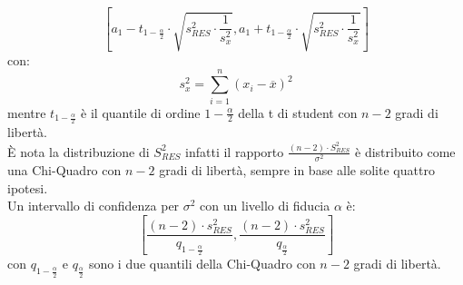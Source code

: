 \documentclass[a4paper,12pt, oneside]{book}
\begin{document}
  \[\left[a_{1}-t_{1-\frac{\alpha}{2}} \cdot \sqrt{s_{R E S}^{2} \cdot \frac{1}{s_{x}^{2}}}, a_{1}+t_{1-\frac{\alpha}{2}} \cdot \sqrt{s_{R E S}^{2} \cdot \frac{1}{s_{x}^{2}}}\right]\]
con:
\[s_{x}^{2}=\sum_{i=1}^{n}\left(x_{i}-\overline{x}\right)^{2}\]
mentre $t_{1-\frac{\alpha}{2}}$ è il quantile di ordine $1-\frac{\alpha}{2}$ della t di student con $n-2$ gradi di libertà.\\
È nota la distribuzione di $S_{RES}^2$ infatti il rapporto $\frac{(n-2) \cdot S_{R E S}^{2}}{\sigma^{2}}$
è distribuito come una Chi-Quadro con $n-2$ gradi di libertà, sempre in base alle solite quattro ipotesi.\\
Un intervallo di confidenza per $\sigma^2$ con un livello di fiducia $\alpha$ è:
\[\left[\frac{(n-2) \cdot s_{R E S}^{2}}{q_{1-\frac{\alpha}{2}}}, \frac{(n-2) \cdot s_{R E S}^{2}}{q_{\frac{\alpha}{2}}}\right]\]
con $q_{1-\frac{\alpha}{2}}$ e $q_{\frac{\alpha}{2}}$ sono i due quantili della Chi-Quadro con $n-2$ gradi di libertà.\\
\end{document}

